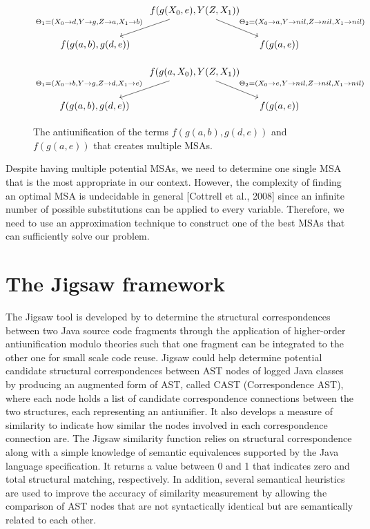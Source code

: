 \begin{figure} [H]
\[
\begin{tikzcd}[column sep=small]
&
  f(g(X_0,e),Y(Z,X_1))
  \arrow{dr}{\Theta_2 = ( X_0 \rightarrow a, Y \rightarrow nil, Z \rightarrow nil, X_1 \rightarrow nil) }
  \arrow[->,swap]{dl}{\Theta_1 = ( X_0 \rightarrow d, Y \rightarrow g, Z \rightarrow a, X_1 \rightarrow b)} %
\\
f(g(a,b), g(d,e))
&&
f(g(a,e))
\end{tikzcd}
\]	

\[
\begin{tikzcd}[column sep=small]
&
  f(g(a,X_0),Y(Z,X_1))
  \arrow{dr}{\Theta_2 = ( X_0 \rightarrow e, Y \rightarrow nil, Z \rightarrow nil, X_1 \rightarrow nil) }
  \arrow[->,swap]{dl}{\Theta_1 = ( X_0 \rightarrow b, Y \rightarrow g, Z \rightarrow d, X_1 \rightarrow e)} %
\\
f(g(a,b), g(d,e))
&&
f(g(a,e))
\end{tikzcd}
\]
  \caption{The antiunification of the terms $f(g(a,b), g(d,e))$
and $f(g(a,e))$ that creates multiple MSAs.}
  \label{fig:multipleMSA}
\end{figure}


Despite having multiple potential MSAs, we need to determine one single MSA that is the most appropriate in our context. However, the complexity of finding an optimal MSA is undecidable in general [Cottrell et al., 2008] since an infinite number of possible substitutions can be applied to every variable. Therefore, we need to use an approximation technique to construct one of the best MSAs that can sufficiently solve our problem.


\section{The Jigsaw framework}  \label{Jigsaw}
The Jigsaw tool is developed by \citet{cottrell2008semi} to determine the structural correspondences between two Java source code fragments through the application of higher-order antiunification modulo theories such that one fragment can be integrated to the other one for small scale code reuse. Jigsaw could help determine potential candidate structural correspondences between AST nodes of logged Java classes by producing an augmented form of AST, called CAST (Correspondence AST), where each node holds a list of candidate correspondence connections between the two structures, each representing an antiunifier. It also develops a measure of similarity to indicate how similar the nodes involved in each correspondence connection are. The Jigsaw similarity function relies on structural correspondence along with a simple knowledge of semantic equivalences supported by the Java language specification. It returns a value between 0 and 1 that indicates zero and total structural matching, respectively. In addition, several semantical heuristics are used to improve the accuracy of similarity measurement by allowing the comparison of AST nodes that are not syntactically identical but are semantically related to each other.

